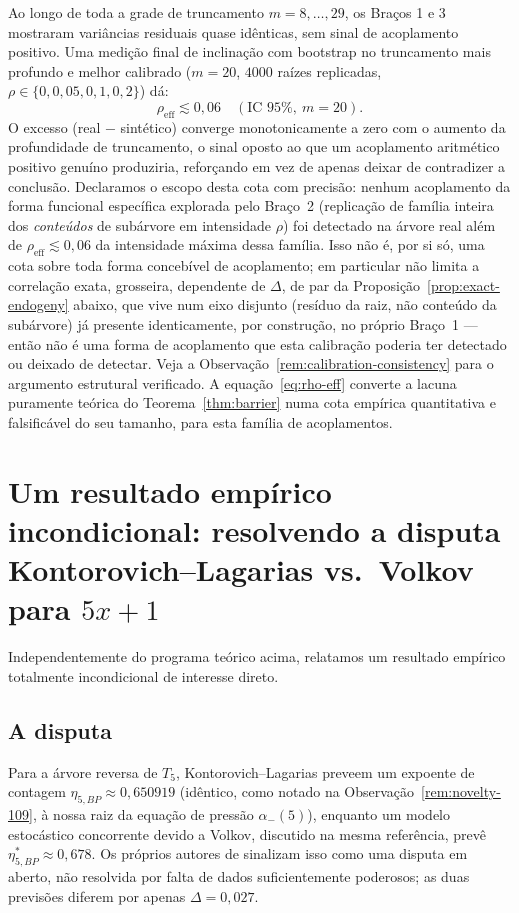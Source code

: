 \documentclass[11pt]{article}
\theoremstyle{definition}
\theoremstyle{remark}
\begin{document}
Ao longo de toda a grade de truncamento $m=8,\dots,29$, os Braços 1 e 3
mostraram variâncias residuais quase idênticas, sem sinal de
acoplamento positivo. Uma medição final de inclinação com bootstrap no
truncamento mais profundo e melhor calibrado ($m=20$, $4000$ raízes
replicadas, $\rho\in\{0,0{,}05,0{,}1,0{,}2\}$) dá:
\begin{equation}\label{eq:rho-eff}
  \rho_{\mathrm{eff}} \lesssim 0{,}06 \quad (\text{IC } 95\%, \ m=20).
\end{equation}
O excesso (real $-$ sintético) converge monotonicamente a zero com o
aumento da profundidade de truncamento, o sinal oposto ao que um
acoplamento aritmético positivo genuíno produziria, reforçando em vez
de apenas deixar de contradizer a conclusão. Declaramos o escopo desta
cota com precisão: nenhum acoplamento da forma funcional específica
explorada pelo Braço~2 (replicação de família inteira dos
\emph{conteúdos} de subárvore em intensidade $\rho$) foi detectado na
árvore real além de $\rho_{\mathrm{eff}}\lesssim0{,}06$ da intensidade
máxima dessa família. Isso não é, por si só, uma cota sobre toda forma
concebível de acoplamento; em particular não limita a correlação
exata, grosseira, dependente de $\Delta$, de par da
Proposição~\ref{prop:exact-endogeny} abaixo, que vive num eixo
disjunto (resíduo da raiz, não conteúdo da subárvore) já presente
identicamente, por construção, no próprio Braço~1 --- então não é uma
forma de acoplamento que esta calibração poderia ter detectado ou
deixado de detectar. Veja a Observação~\ref{rem:calibration-consistency}
para o argumento estrutural verificado. A equação~\eqref{eq:rho-eff}
converte a lacuna puramente
teórica do Teorema~\ref{thm:barrier} numa cota empírica quantitativa e
falsificável do seu tamanho, para esta família de acoplamentos.

\section{Um resultado empírico incondicional: resolvendo a disputa
Kontorovich--Lagarias vs.\ Volkov para $5x+1$}
\label{sec:kl}

Independentemente do programa teórico acima, relatamos um resultado
empírico totalmente incondicional de interesse direto.

\subsection{A disputa}

Para a árvore reversa de $T_5$, Kontorovich--Lagarias
\cite{KontorovichLagarias2009} preveem um expoente de contagem
$\eta_{5,BP}\approx 0{,}650919$ (idêntico, como notado na
Observação~\ref{rem:novelty-109}, à nossa raiz da equação de pressão
$\alpha_-(5)$), enquanto um modelo estocástico concorrente devido a
Volkov, discutido na mesma referência, prevê
$\eta^\ast_{5,BP}\approx 0{,}678$. Os próprios autores de
\cite{KontorovichLagarias2009} sinalizam isso como uma
disputa em aberto, não resolvida por falta de dados suficientemente
poderosos; as duas previsões diferem por apenas $\Delta=0{,}027$.
\end{document}
